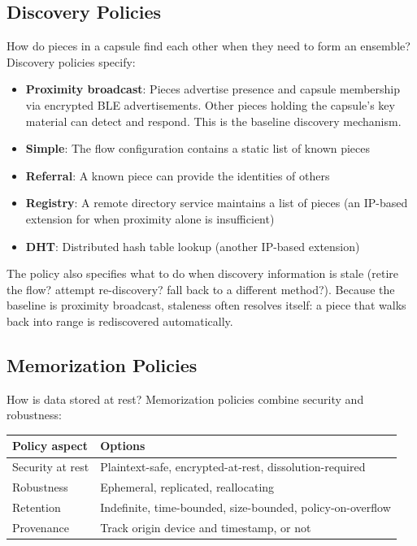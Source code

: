 \documentclass[11pt, letterpaper]{article}
\begin{document}
\subsection{Discovery Policies}

How do pieces in a capsule find each other when they need to form an ensemble?
Discovery policies specify:
\begin{itemize}[leftmargin=2em]
  \item \textbf{Proximity broadcast}: Pieces advertise presence and capsule membership
    via encrypted BLE advertisements. Other pieces holding the capsule's key material
    can detect and respond. This is the baseline discovery mechanism.
  \item \textbf{Simple}: The flow configuration contains a static list of known pieces
  \item \textbf{Referral}: A known piece can provide the identities of others
  \item \textbf{Registry}: A remote directory service maintains a list of pieces
    (an IP-based extension for when proximity alone is insufficient)
  \item \textbf{DHT}: Distributed hash table lookup (another IP-based extension)
\end{itemize}

The policy also specifies what to do when discovery information is stale (retire the
flow? attempt re-discovery? fall back to a different method?). Because the baseline
is proximity broadcast, staleness often resolves itself: a piece that walks back into
range is rediscovered automatically.

\subsection{Memorization Policies}

How is data stored at rest? Memorization policies combine security and robustness:

\begin{center}
\begin{tabularx}{\textwidth}{l X}
\toprule
\textbf{Policy aspect} & \textbf{Options} \\
\midrule
Security at rest & Plaintext-safe, encrypted-at-rest, dissolution-required \\
Robustness & Ephemeral, replicated, reallocating \\
Retention & Indefinite, time-bounded, size-bounded, policy-on-overflow \\
Provenance & Track origin device and timestamp, or not \\
\bottomrule
\end{tabularx}
\end{center}
\end{document}

